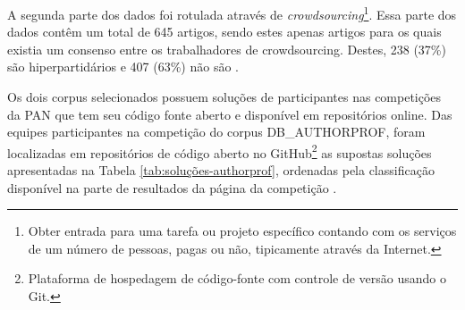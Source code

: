 \begin{itemize}
        A segunda parte dos dados foi rotulada através de \textit{crowdsourcing}\footnote{Obter entrada para uma tarefa ou projeto específico contando com os serviços de um número de pessoas, pagas ou não, tipicamente através da Internet.}. 
        Essa parte dos dados contêm um total de 645 artigos, sendo estes apenas artigos para os quais existia um consenso entre os trabalhadores de crowdsourcing. 
        Destes, 238 (37\%) são hiperpartidários e 407 (63\%) não são \cite{johannes_kiesel_2018_1489920}. 
        
    \end{itemize}
    
    Os dois corpus selecionados possuem soluções de participantes nas competições da PAN que tem seu código fonte aberto e disponível em repositórios online.
    Das equipes participantes na competição do corpus DB\_AUTHORPROF, foram localizadas em repositórios de código aberto no GitHub\footnote{Plataforma de hospedagem de código-fonte com controle de versão usando o Git.} as supostas soluções  apresentadas na Tabela \ref{tab:soluções-authorprof}, ordenadas pela classificação disponível na parte de resultados da página da competição .
        
        

